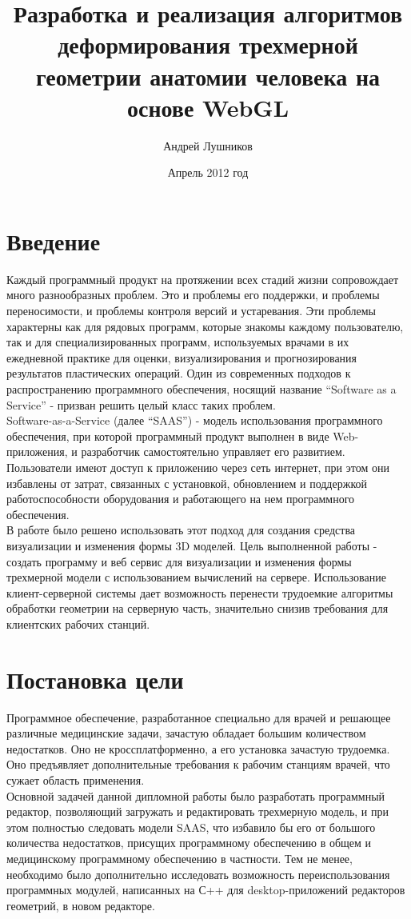 \documentclass[12pt, a4paper]{article}
\author{Андрей Лушников}
\title{Разработка и реализация алгоритмов деформирования трехмерной геометрии анатомии человека на основе WebGL}
\date{Апрель 2012 год}
\let\stdsection\section
\renewcommand\section{\newpage\stdsection}
\begin{document}
\maketitle

\tableofcontents
\newpage

\section{Введение}
Каждый программный продукт на протяжении всех стадий жизни сопровождает много
разнообразных проблем. Это и проблемы его поддержки, и проблемы переносимости, и
проблемы контроля версий и устаревания. Эти проблемы характерны как для рядовых
программ, которые знакомы каждому пользователю, так и для специализированных
программ, используемых врачами в их ежедневной практике для оценки,
визуализирования и прогнозирования результатов пластических операций. Один из
современных подходов к распространению программного обеспечения, носящий
название ``Software as a Service'' - призван решить целый класс таких проблем.
\\
Software-as-a-Service (далее ``SAAS'') - модель использования программного
обеспечения, при которой программный продукт выполнен в виде Web-приложения, и
разработчик самостоятельно управляет его развитием. Пользователи имеют доступ к
приложению через сеть интернет, при этом они избавлены от затрат, связанных с
установкой, обновлением и поддержкой работоспособности оборудования и
работающего на нем программного обеспечения.
\\
В работе было решено использовать этот подход для создания средства визуализации
и изменения формы 3D моделей.  Цель выполненной работы - создать программу и веб
сервис для визуализации и изменения формы трехмерной модели с использованием
вычислений на сервере. Использование клиент-серверной системы дает возможность
перенести трудоемкие алгоритмы обработки геометрии на серверную часть,
значительно снизив требования для клиентских рабочих станций.

\section{Постановка цели}
Программное обеспечение, разработанное специально для врачей и решающее
различные медицинские задачи, зачастую обладает большим количеством недостатков.
Оно не кроссплатформенно, а его установка зачастую трудоемка. Оно предъявляет
дополнительные требования к рабочим станциям врачей, что сужает область
применения.
\\
Основной задачей данной дипломной работы было разработать программный редактор,
позволяющий загружать и редактировать трехмерную модель, и при этом полностью
следовать модели SAAS, что избавило бы его от большого количества недостатков,
присущих программному обеспечению в общем и медицинскому программному
обеспечению в частности. Тем не менее, необходимо было дополнительно исследовать
возможность переиспользования программных модулей, написанных на С++ для
desktop-приложений редакторов геометрий, в новом редакторе.
\end{document}
